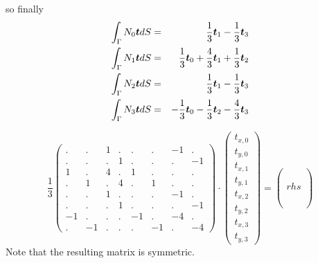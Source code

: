 \newpage
so finally
\begin{eqnarray}
\int_{\Gamma} N_0 {\bm t} dS &=& \frac{1}{3} {\bm t}_1 -  \frac{1}{3} {\bm t}_3  \nonumber\\ 
\int_{\Gamma} N_1 {\bm t} dS &=& \frac{1}{3} {\bm t}_0 + \frac{4}{3} {\bm t}_1 +  \frac{1}{3} {\bm t}_2 \nonumber\\   
\int_{\Gamma} N_2 {\bm t} dS &=& \frac{1}{3} {\bm t}_1  -\frac{1}{3}  {\bm t}_3\nonumber\\ 
\int_{\Gamma} N_3 {\bm t} dS &=& -\frac{1}{3} {\bm t}_0 - \frac{1}{3} {\bm t}_2 - \frac{4}{3} {\bm t}_3 \nonumber
\end{eqnarray}
 
\[
\frac{1}{3}
\left(
\begin{array}{cccccccc}
. &. &1 &. &. &. &-1 & .\\
.& . &. &1 &. &. &. &-1 \\
1 & . & 4 & . & 1 &. & .& .\\
. &1 & . & 4 & . & 1 &. & . \\
. & . & 1 & .& . & . & -1 & .\\
. & . & . & 1 & .& . & . & -1 \\
-1 & . & . & . & -1 & .  & -4 & . \\
. & -1 & . & . & . & -1 & .  & -4  
\end{array}
\right)
\cdot
\left(
\begin{array}{c}
t_{x,0}\\
t_{y,0}\\
t_{x,1}\\
t_{y,1}\\
t_{x,2}\\
t_{y,2}\\
t_{x,3}\\
t_{y,3}
\end{array}
\right)
=
\left(
\begin{array}{c}
\\
\\
\\
rhs\\
\\
\\
\\
\end{array}
\right)
\]
Note that the resulting matrix is symmetric.


